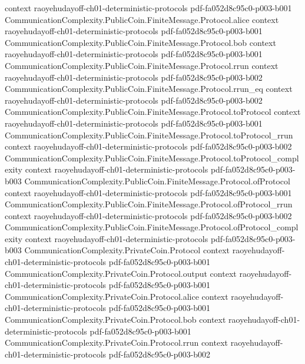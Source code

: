\begin{theorem}
  {context}
  {raoyehudayoff-ch01-deterministic-protocols}
  {pdf-fa052d8c95c0-p003-b001}
\proofstep
  {CommunicationComplexity.PublicCoin.FiniteMessage.Protocol.alice}
  {context}
  {raoyehudayoff-ch01-deterministic-protocols}
  {pdf-fa052d8c95c0-p003-b001}
\proofstep
  {CommunicationComplexity.PublicCoin.FiniteMessage.Protocol.bob}
  {context}
  {raoyehudayoff-ch01-deterministic-protocols}
  {pdf-fa052d8c95c0-p003-b001}
\proofstep
  {CommunicationComplexity.PublicCoin.FiniteMessage.Protocol.rrun}
  {context}
  {raoyehudayoff-ch01-deterministic-protocols}
  {pdf-fa052d8c95c0-p003-b002}
\proofstep
  {CommunicationComplexity.PublicCoin.FiniteMessage.Protocol.rrun_eq}
  {context}
  {raoyehudayoff-ch01-deterministic-protocols}
  {pdf-fa052d8c95c0-p003-b002}
\proofstep
  {CommunicationComplexity.PublicCoin.FiniteMessage.Protocol.toProtocol}
  {context}
  {raoyehudayoff-ch01-deterministic-protocols}
  {pdf-fa052d8c95c0-p003-b001}
\proofstep
  {CommunicationComplexity.PublicCoin.FiniteMessage.Protocol.toProtocol_rrun}
  {context}
  {raoyehudayoff-ch01-deterministic-protocols}
  {pdf-fa052d8c95c0-p003-b002}
\proofstep
  {CommunicationComplexity.PublicCoin.FiniteMessage.Protocol.toProtocol_complexity}
  {context}
  {raoyehudayoff-ch01-deterministic-protocols}
  {pdf-fa052d8c95c0-p003-b003}
\proofstep
  {CommunicationComplexity.PublicCoin.FiniteMessage.Protocol.ofProtocol}
  {context}
  {raoyehudayoff-ch01-deterministic-protocols}
  {pdf-fa052d8c95c0-p003-b001}
\proofstep
  {CommunicationComplexity.PublicCoin.FiniteMessage.Protocol.ofProtocol_rrun}
  {context}
  {raoyehudayoff-ch01-deterministic-protocols}
  {pdf-fa052d8c95c0-p003-b002}
\proofstep
  {CommunicationComplexity.PublicCoin.FiniteMessage.Protocol.ofProtocol_complexity}
  {context}
  {raoyehudayoff-ch01-deterministic-protocols}
  {pdf-fa052d8c95c0-p003-b003}
\proofstep
  {CommunicationComplexity.PrivateCoin.Protocol}
  {context}
  {raoyehudayoff-ch01-deterministic-protocols}
  {pdf-fa052d8c95c0-p003-b001}
\proofstep
  {CommunicationComplexity.PrivateCoin.Protocol.output}
  {context}
  {raoyehudayoff-ch01-deterministic-protocols}
  {pdf-fa052d8c95c0-p003-b001}
\proofstep
  {CommunicationComplexity.PrivateCoin.Protocol.alice}
  {context}
  {raoyehudayoff-ch01-deterministic-protocols}
  {pdf-fa052d8c95c0-p003-b001}
\proofstep
  {CommunicationComplexity.PrivateCoin.Protocol.bob}
  {context}
  {raoyehudayoff-ch01-deterministic-protocols}
  {pdf-fa052d8c95c0-p003-b001}
\proofstep
  {CommunicationComplexity.PrivateCoin.Protocol.rrun}
  {context}
  {raoyehudayoff-ch01-deterministic-protocols}
  {pdf-fa052d8c95c0-p003-b002}

\end{theorem}
